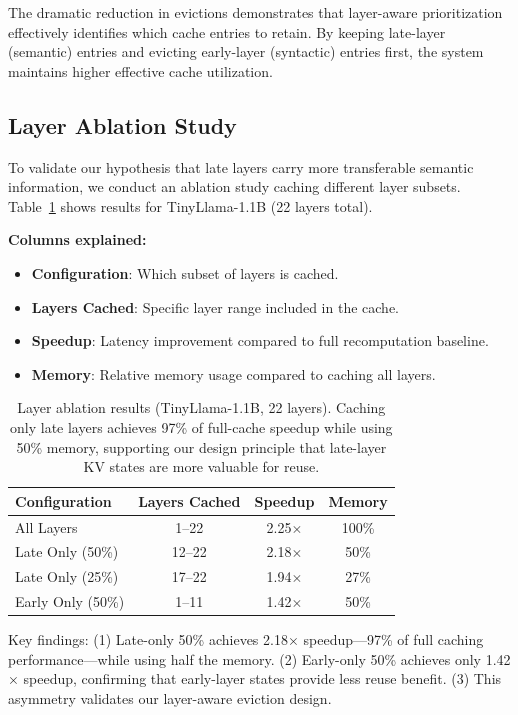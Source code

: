\documentclass{article}
\begin{document}
The dramatic reduction in evictions demonstrates that layer-aware prioritization effectively identifies which cache entries to retain. By keeping late-layer (semantic) entries and evicting early-layer (syntactic) entries first, the system maintains higher effective cache utilization.

\subsection{Layer Ablation Study}

To validate our hypothesis that late layers carry more transferable semantic information, we conduct an ablation study caching different layer subsets.
Table~\ref{tab:layer_ablation} shows results for TinyLlama-1.1B (22 layers total).

\textbf{Columns explained:}
\begin{itemize}
    \item \textbf{Configuration}: Which subset of layers is cached.
    \item \textbf{Layers Cached}: Specific layer range included in the cache.
    \item \textbf{Speedup}: Latency improvement compared to full recomputation baseline.
    \item \textbf{Memory}: Relative memory usage compared to caching all layers.
\end{itemize}

\begin{table}[h]
\centering
\caption{Layer ablation results (TinyLlama-1.1B, 22 layers). Caching only late layers achieves 97\% of full-cache speedup while using 50\% memory, supporting our design principle that late-layer KV states are more valuable for reuse.}
\label{tab:layer_ablation}
\begin{tabular}{lccc}
\toprule
Configuration & Layers Cached & Speedup & Memory \\
\midrule
All Layers & 1--22 & 2.25$\times$ & 100\% \\
Late Only (50\%) & 12--22 & 2.18$\times$ & 50\% \\
Late Only (25\%) & 17--22 & 1.94$\times$ & 27\% \\
Early Only (50\%) & 1--11 & 1.42$\times$ & 50\% \\
\bottomrule
\end{tabular}
\end{table}

Key findings: (1) Late-only 50\% achieves 2.18$\times$ speedup---97\% of full caching performance---while using half the memory. (2) Early-only 50\% achieves only 1.42$\times$ speedup, confirming that early-layer states provide less reuse benefit. (3) This asymmetry validates our layer-aware eviction design.
\end{document}
